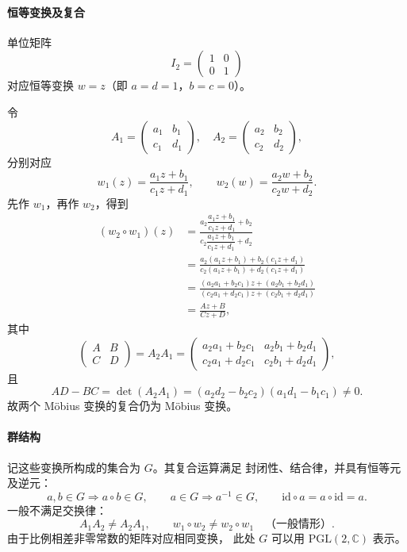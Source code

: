 

\paragraph{恒等变换及复合}
单位矩阵
\[
  I_2=\begin{pmatrix}1&0\\0&1\end{pmatrix}
\]
对应恒等变换 $w=z$（即 $a=d=1$，$b=c=0$）。

令
\[
  A_1=\begin{pmatrix}a_1&b_1\\c_1&d_1\end{pmatrix},
  \quad
  A_2=\begin{pmatrix}a_2&b_2\\c_2&d_2\end{pmatrix},
\]
分别对应
\[
  w_1(z)=\frac{a_1z+b_1}{c_1z+d_1},\qquad
  w_2(w)=\frac{a_2w+b_2}{c_2w+d_2}.
\]
先作 $w_1$，再作 $w_2$，得到
\begin{align*}
  (w_2\circ w_1)(z)
  &=\frac{a_2\dfrac{a_1z+b_1}{c_1z+d_1}+b_2}
          {c_2\dfrac{a_1z+b_1}{c_1z+d_1}+d_2}\\
  &=\frac{a_2(a_1z+b_1)+b_2(c_1z+d_1)}
          {c_2(a_1z+b_1)+d_2(c_1z+d_1)}\\
  &=\frac{(a_2a_1+b_2c_1)z+(a_2b_1+b_2d_1)}
          {(c_2a_1+d_2c_1)z+(c_2b_1+d_2d_1)}\\
  &=\frac{Az+B}{Cz+D},
\end{align*}
其中
\[
  \begin{pmatrix}A&B\\C&D\end{pmatrix}
  =A_2A_1
  =\begin{pmatrix}
    a_2a_1+b_2c_1&a_2b_1+b_2d_1\\
    c_2a_1+d_2c_1&c_2b_1+d_2d_1
   \end{pmatrix},
\]
且
\[
  AD-BC
  =\det(A_2A_1)
  =(a_2d_2-b_2c_2)(a_1d_1-b_1c_1)\ne0.
\]
故两个 Möbius 变换的复合仍为 Möbius 变换。

\paragraph{群结构}
记这些变换所构成的集合为 $G$。其复合运算满足
封闭性、结合律，并具有恒等元及逆元：
\[
  a,b\in G\Rightarrow a\circ b\in G,\qquad
  a\in G\Rightarrow a^{-1}\in G,\qquad
  \mathrm{id}\circ a=a\circ\mathrm{id}=a.
\]
一般不满足交换律：
\[
  A_1A_2\ne A_2A_1,\qquad
  w_1\circ w_2\ne w_2\circ w_1
  \quad\text{（一般情形）}.
\]
由于比例相差非零常数的矩阵对应相同变换，
此处 $G$ 可以用 $\mathrm{PGL}(2,\mathbb C)$ 表示。

